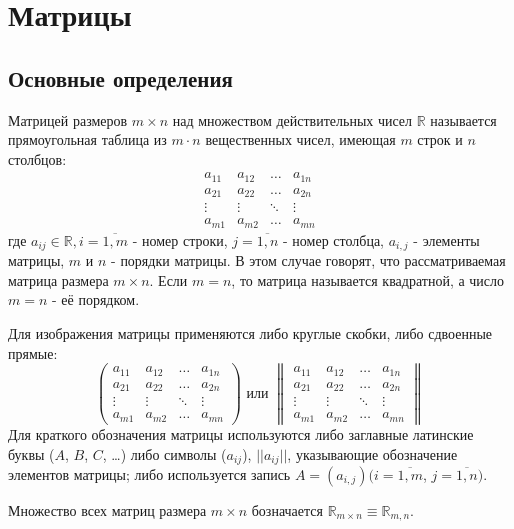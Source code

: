 \section{Матрицы}
\subsection{Основные определения}
\begin{definition}
  Матрицей размеров $m \times n$ над множеством действительных чисел $\mathds{R}$
  называется прямоугольная таблица из $m \cdot n$ вещественных чисел, имеющая $m$ строк и $n$ столбцов:
  \[ \begin{array}{cccc}
    a_{11}& a_{12} &\ldots & a_{1n}\\
    a_{21}& a_{22} &\ldots & a_{2n}\\
    \vdots& \vdots &\ddots & \vdots\\
    a_{m1}& a_{m2} &\ldots & a_{mn}
  \end{array} \]
  где $a_{ij} \in \mathds{R}, i = \overline{1, m}$ - номер строки,
    $j = \overline{1, n}$ - номер столбца, $a_{i,j}$ - элементы матрицы, $m$ и $n$ - порядки матрицы.
  В этом случае говорят, что рассматриваемая матрица размера $m \times n$.
  Если $m = n$, то матрица называется квадратной, а число $m = n$ - её порядком.
\end{definition}
Для изображения матрицы применяются либо круглые скобки, либо сдвоенные прямые:
  \[ \left( \begin{array}{cccc}
    a_{11}& a_{12} &\ldots & a_{1n}\\
    a_{21}& a_{22} &\ldots & a_{2n}\\
    \vdots& \vdots &\ddots & \vdots\\
    a_{m1}& a_{m2} &\ldots & a_{mn}
  \end{array} \right)
  \text{ или }
  \begin{Vmatrix}
    a_{11}& a_{12} &\ldots & a_{1n}\\
    a_{21}& a_{22} &\ldots & a_{2n}\\
    \vdots& \vdots &\ddots & \vdots\\
    a_{m1}& a_{m2} &\ldots & a_{mn}
    \end{Vmatrix}
  \]
Для краткого обозначения матрицы используются либо заглавные латинские буквы ($A$, $B$, $C$, \dots)
либо символы ($a_{ij}$), $||a_{ij}||$, указывающие обозначение элементов матрицы;
либо используется запись
$A = (a_{i,j})(i = \overline{1,m}$, $j = \overline{1,n})$.

Множество всех матриц размера $m \times n$ бозначается $\mathds{R}_{m \times n} \equiv \mathds{R}_{m,n}$.
